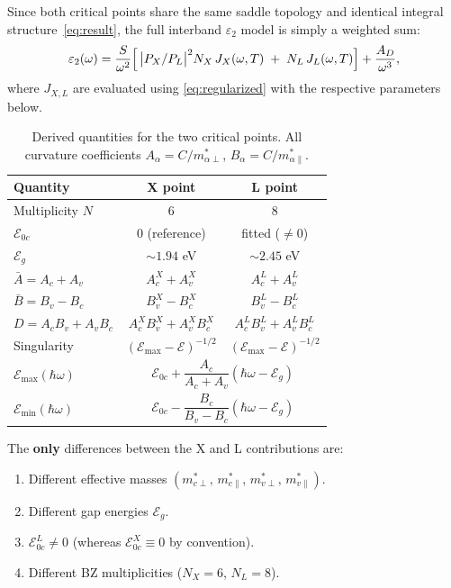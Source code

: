 \documentclass[11pt,a4paper]{article}
\newcommand{\E}{\mathcal{E}}              %
\newcommand{\Eoc}{\E_{0c}}
\newcommand{\Eg}{\E_g}
\newcommand{\Emax}{\E_{\max}}
\newcommand{\Emin}{\E_{\min}}
\newcommand{\Abar}{\bar{A}}
\newcommand{\Bbar}{\bar{B}}
\newcommand{\hw}{\hbar\omega}
\begin{document}
Since both critical points share the same saddle topology and identical integral structure~\eqref{eq:result}, the full interband $\varepsilon_2$ model is simply a weighted sum:
\begin{equation}
  \varepsilon_2(\omega) = \frac{S}{\omega^2}
  \Bigl[\,\bigl|P_X/P_L\bigr|^2 N_X\, J_X(\omega,T)
  \;+\; N_L\, J_L(\omega,T)\Bigr]
  + \frac{A_D}{\omega^3},
\end{equation}
where $J_{X,L}$ are evaluated using \eqref{eq:regularized} with the respective parameters below.

\begin{table}[h]
  \centering
  \caption{Derived quantities for the two critical points. All curvature coefficients $A_\alpha = C/m^*_{\alpha\perp}$, $B_\alpha = C/m^*_{\alpha\parallel}$.}\label{tab:derived}
  \smallskip
  \renewcommand{\arraystretch}{1.3}
  \small
  \begin{tabular}{@{}lcc@{}}
    \toprule
    Quantity & \textbf{X point} & \textbf{L point} \\
    \midrule
    Multiplicity $N$ & 6 & 8 \\[2pt]
    $\Eoc$ & 0 (reference) & fitted ($\neq 0$) \\[2pt]
    $\Eg$ & ${\sim}1.94$ eV & ${\sim}2.45$ eV \\[2pt]
    $\Abar = A_c + A_v$ & $A_c^X + A_v^X$ & $A_c^L + A_v^L$ \\[2pt]
    $\Bbar = B_v - B_c$ & $B_v^X - B_c^X$ & $B_v^L - B_c^L$ \\[2pt]
    $D = A_cB_v + A_vB_c$ & $A_c^X B_v^X + A_v^X B_c^X$ & $A_c^L B_v^L + A_v^L B_c^L$ \\[2pt]
    Singularity & $(\Emax - \E)^{-1/2}$ & $(\Emax - \E)^{-1/2}$ \\[2pt]
    $\Emax(\hw)$ & \multicolumn{2}{c}{$\Eoc + \dfrac{A_c}{A_c+A_v}(\hw - \Eg)$} \\[8pt]
    $\Emin(\hw)$ & \multicolumn{2}{c}{$\Eoc - \dfrac{B_c}{B_v-B_c}(\hw - \Eg)$} \\[6pt]
    \bottomrule
  \end{tabular}
\end{table}

The \textbf{only} differences between the X and L contributions are:
\begin{enumerate}[nosep]
  \item Different effective masses $(m^*_{c\perp},\, m^*_{c\parallel},\, m^*_{v\perp},\, m^*_{v\parallel})$.
  \item Different gap energies $\Eg$.
  \item $\Eoc^L \neq 0$ (whereas $\Eoc^X \equiv 0$ by convention).
  \item Different BZ multiplicities ($N_X = 6$, $N_L = 8$).
\end{enumerate}
\end{document}
